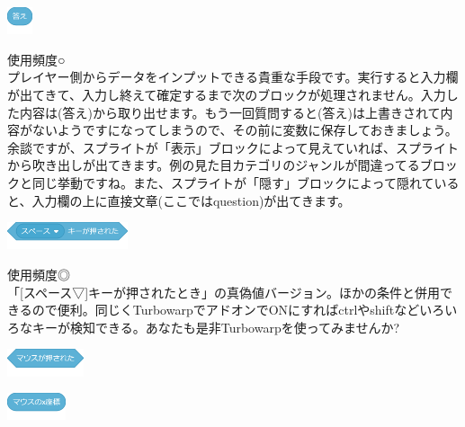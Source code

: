\documentclass[b5paper,10pt]{jsarticle}
\begin{document}
\begin{multicols*}{3}
\begin{itembox}{5}
\includegraphics[height=8mm]{images/sensing_6.png}
\end{itembox}
使用頻度○\\
プレイヤー側からデータをインプットできる貴重な手段です。実行すると入力欄が出てきて、入力し終えて確定するまで次のブロックが処理されません。入力した内容は(答え)から取り出せます。もう一回質問すると(答え)は上書きされて内容がないようですになってしまうので、その前に変数に保存しておきましょう。余談ですが、スプライトが「表示」ブロックによって見えていれば、スプライトから吹き出しが出てきます。例の見た目カテゴリのジャンルが間違ってるブロックと同じ挙動ですね。また、スプライトが「隠す」ブロックによって隠れていると、入力欄の上に直接文章(ここではquestion)が出てきます。
\begin{itembox}{6}
\includegraphics[height=8mm]{images/sensing_7.png}
\end{itembox}
使用頻度◎\\
「[スペース▽]キーが押されたとき」の真偽値バージョン。ほかの条件と併用できるので便利。同じくTurbowarpでアドオンでONにすればctrlやshiftなどいろいろなキーが検知できる。あなたも是非Turbowarpを使ってみませんか?
\begin{itembox}{7}
\includegraphics[height=8mm]{images/sensing_8.png}

\includegraphics[height=8mm]{images/sensing_9.png}


\end{itembox}
\end{multicols*}
\end{document}
